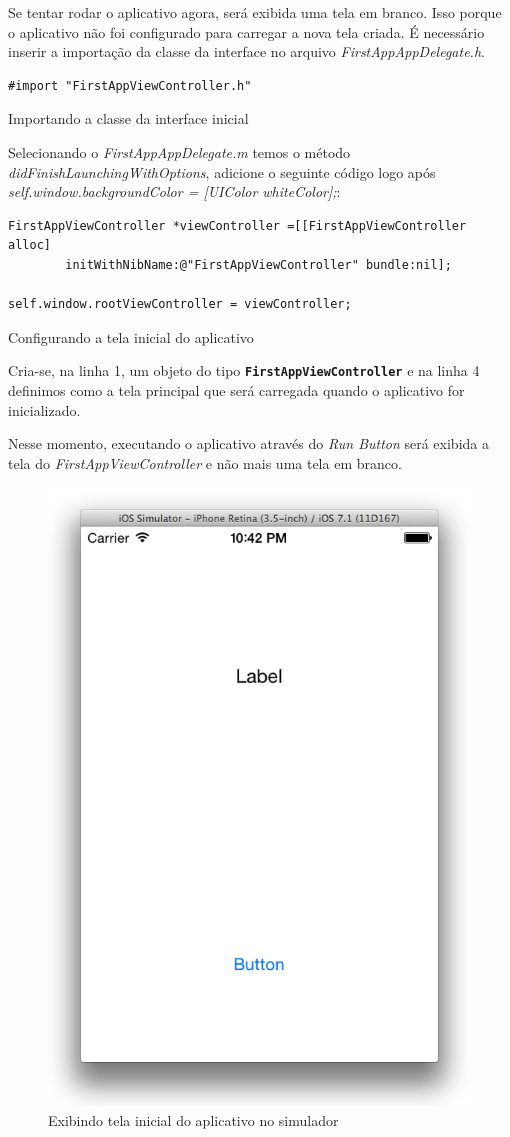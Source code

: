 \documentclass[a4paper,12pt,brazil,doubleside]{book}
\begin{document}
\begin{singlespace}
Se tentar rodar o aplicativo agora, será exibida uma tela em branco. Isso porque o aplicativo não foi configurado para carregar a nova tela criada. É necessário inserir a importação da classe da interface no arquivo \emph{FirstAppAppDelegate.h}.

\begin{listing}[H]
\begin{verbatim}
#import "FirstAppViewController.h"
\end{verbatim}
\caption{Importando a classe da interface inicial}
\end{listing}


Selecionando o \emph{FirstAppAppDelegate.m} temos o método \emph{didFinishLaunchingWithOptions}, adicione o seguinte código logo após \emph{self.window.backgroundColor = [UIColor whiteColor];}:

\begin{listing}[H]
\begin{verbatim}
FirstAppViewController *viewController =[[FirstAppViewController alloc] 
		initWithNibName:@"FirstAppViewController" bundle:nil];
		
self.window.rootViewController = viewController;    
\end{verbatim}
\caption{Configurando a tela inicial do aplicativo}
\end{listing}


Cria-se, na linha 1, um objeto do tipo \texttt{\textbf{FirstAppViewController}} e na linha 4 definimos como a tela principal que será carregada quando o aplicativo for inicializado. 

Nesse momento, executando o aplicativo através do \emph{Run Button} será exibida a tela do \emph{FirstAppViewController} e não mais uma tela em branco.

\begin{figure}[H]
  \centering
  \includegraphics[width=.55\textwidth]{figuras/3/tela_novo_projeto_18.png}
  \caption{Exibindo tela inicial do aplicativo no simulador}
  \label{fig:a}
\end{figure}


\end{singlespace}
\end{document}
